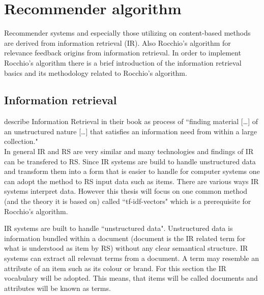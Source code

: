 
\section{Recommender algorithm}
Recommender systems and especially those utilizing on content-based methods are derived from information retrieval (IR).\citep[p.~92-99]{lops:2011}
Also Rocchio's algorithm for relevance feedback origins from information retrieval.\citep[p.~178]{manning:2009}
In order to implement Rocchio's algorithm there is a brief introduction of the information retrieval basics and its methodology related to Rocchio's algorithm.

\subsection{Information retrieval}
\citeauthor{manning:2009} describe Information Retrieval in their book as process of ``finding material [\dots] of an unstructured nature [\dots] that satisfies an information need from within a large collection."\citep[p.~1]{manning:2009}\\
In general IR and RS are very similar and many technologies and findings of IR can be transfered to RS.
Since IR systems are build to handle unstructured data and transform them into a form that is easier to handle for computer systems one can adopt the method to RS input data such as items.\citep[p.~21-23]{ricci:2011}
There are various ways IR systems interpret data.
However this thesis will focus on one common method (and the theory it is based on) called ``tf-idf-vectors" which is a prerequisite for Rocchio's algorithm.\citep[p.~93]{lops:2011}

IR systems are built to handle ``unstructured data".
Unstructured data is information bundled within a document (document is the IR related term for what is understood as item by RS) without any clear semantical structure.\citep[p.~1-3]{manning:2009}
IR systems can extract all relevant terms from a document.
A term may resemble an attribute of an item such as its colour or brand.
For this section the IR vocabulary will be adopted.
This means, that items will be called documents and attributes will be known as terms.

